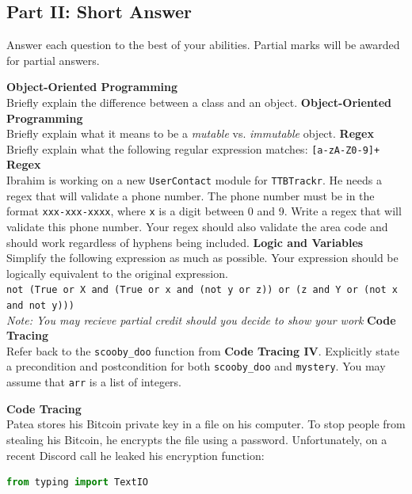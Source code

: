 \documentclass[letterpaper,13pt,addpoints]{exam}
\begin{document}
\begin{questions}
    \setcounter{question}{0}
    \clearpage
    \section*{Part II: Short Answer}
    Answer each question to the best of your abilities. Partial marks will be awarded for partial answers.

    \question[5] \textbf{Object-Oriented Programming} \\
    Briefly explain the difference between a class and an object.
    \bigskip
    \bigskip
    \bigskip
    \bigskip
    \question[5] \textbf{Object-Oriented Programming} \\
    Briefly explain what it means to be a \textit{mutable} vs. \textit{immutable} object.
    \bigskip
    \bigskip
    \bigskip
    \bigskip
    \question[5] \textbf{Regex} \\
    Briefly explain what the following regular expression matches: \texttt{[a-zA-Z0-9]+} %
    \bigskip
    \bigskip
    \bigskip
    \bigskip
    \question[5] \textbf{Regex} \\
    Ibrahim is working on a new \texttt{UserContact} module for \texttt{TTBTrackr}. He needs a regex that will validate a phone number. The phone number must be in the format \texttt{xxx-xxx-xxxx}, where \texttt{x} is a digit between 0 and 9. Write a regex that will validate this phone number. Your regex should also validate the area code and should work regardless of hyphens being included.
    \bigskip
    \bigskip
    \bigskip
    \bigskip
    \question[5] \textbf{Logic and Variables} \\
    Simplify the following expression as much as possible. Your expression should be logically equivalent to the original expression. \\
    \texttt{not (True or X and (True or x and (not y or z)) or (z and Y or (not x and not y)))
    } \\
    \textit{Note: You may recieve partial credit should you decide to show your work}
    \clearpage
    \question[10] \textbf{Code Tracing} \\
    Refer back to the \texttt{scooby\_doo} function from \textbf{Code Tracing IV}. Explicitly state a precondition and postcondition for both \texttt{scooby\_doo} and \texttt{mystery}. You may assume that \texttt{arr} is a list of integers.
    \bigskip
    \bigskip
    \bigskip
    \bigskip

    \question[10] \textbf{Code Tracing} \\
    Patea stores his Bitcoin private key in a file on his computer. To stop people from stealing his Bitcoin, he encrypts the file using a password. Unfortunately, on a recent Discord call he leaked his encryption function:
    \begin{lstlisting}[language=Python, style=mystyle]
from typing import TextIO


\end{lstlisting}
\end{questions}
\end{document}
